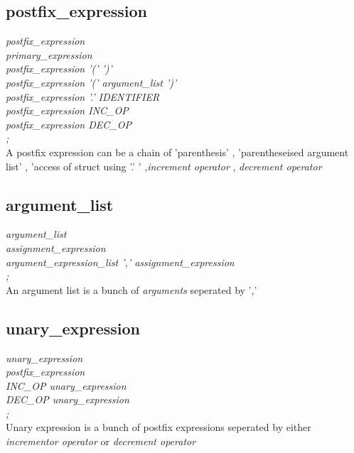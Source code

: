 \documentclass[11pt]{article}
\begin{document}
\subsection{postfix\_expression}
{\itshape
postfix\_expression\\
\hspace*{1cm} primary\_expression\\
\hspace*{1cm}   postfix\_expression '(' ')'\\
\hspace*{1cm}   postfix\_expression '(' argument\_list ')'\\
\hspace*{1cm}   postfix\_expression '.' IDENTIFIER\\
\hspace*{1cm}   postfix\_expression INC\_OP\\
\hspace*{1cm}   postfix\_expression DEC\_OP\\
\hspace*{1cm};\\
}
A postfix expression can be a chain of 'parenthesis' , 'parentheseised argument list' , 'access of struct using '.' ' ,\textit{increment operator} , \textit{decrement operator}
\subsection{argument\_list}
{\itshape
argument\_list\\
\hspace*{1cm} assignment\_expression\\
\hspace*{1cm}   argument\_expression\_list ',' assignment\_expression\\
\hspace*{1cm};\\
}
An argument list is a bunch of \textit{arguments} seperated by ',' 
\subsection{unary\_expression}
{\itshape
unary\_expression\\
\hspace*{1cm} postfix\_expression\\
\hspace*{1cm}   INC\_OP unary\_expression\\
\hspace*{1cm}   DEC\_OP unary\_expression\\
\hspace*{1cm};\\
}
Unary expression is a bunch of postfix expressions seperated by either \textit{incrementor operator} or \textit{decrement operator}
\end{document}
